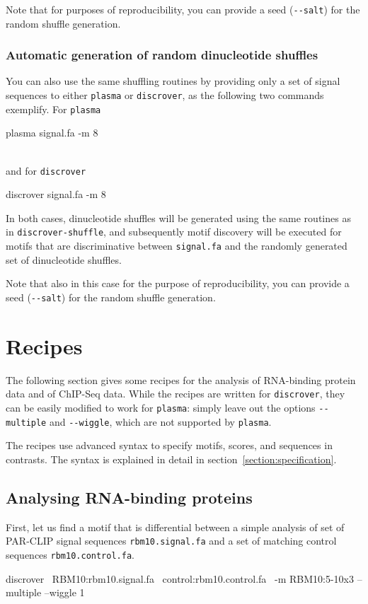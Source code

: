 \documentclass[a4paper]{article}
\newcommand{\plasma}[0]{\texttt{plasma}}
\newcommand{\discrover}[0]{\texttt{discrover}}
\newcommand{\dinuclshuffle}[0]{\texttt{discrover-shuffle}}
\begin{document}
Note that for purposes of reproducibility, you can provide a seed (\verb|--salt|) for the random shuffle generation.

\subsubsection{Automatic generation of random dinucleotide shuffles}
You can also use the same shuffling routines by providing only a set of signal sequences to either \plasma{} or \discrover{}, as the following two commands exemplify.
For \plasma{}\\
\begin{verbbox}
plasma signal.fa -m 8
\end{verbbox}
\fbox{\theverbbox[t]}\\
and for \discrover{}\\
\begin{verbbox}
discrover signal.fa -m 8
\end{verbbox}
\fbox{\theverbbox[t]}

In both cases, dinucleotide shuffles will be generated using the same routines as in \dinuclshuffle{}, and subsequently motif discovery will be executed for motifs that are discriminative between \verb|signal.fa| and the randomly generated set of dinucleotide shuffles.

Note that also in this case for the purpose of reproducibility, you can provide a seed (\verb|--salt|) for the random shuffle generation.


\section{Recipes}
The following section gives some recipes for the analysis of RNA-binding protein data and of ChIP-Seq data.
While the recipes are written for \discrover{}, they can be easily modified to work for \plasma{}:
simply leave out the options \verb|--multiple| and \verb|--wiggle|, which are not supported by \plasma{}.

The recipes use advanced syntax to specify motifs, scores, and sequences in contrasts.
The syntax is explained in detail in section~\ref{section:specification}.

\subsection{Analysing RNA-binding proteins}
First, let us find a motif that is differential between a simple analysis of set of PAR-CLIP signal sequences \verb|rbm10.signal.fa| and a set of matching control sequences \verb|rbm10.control.fa|.
\\
\begin{verbbox}
discrover \
RBM10:rbm10.signal.fa \
control:rbm10.control.fa \
-m RBM10:5-10x3 --multiple --wiggle 1
\end{verbbox}
\fbox{\theverbbox[t]}
\end{document}

